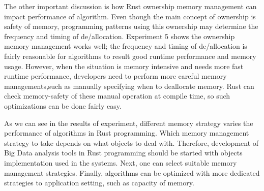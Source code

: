 The other important discussion is how Rust ownership memory management can impact performance of algorithm.
Even though the main concept of ownership is safety of memory, programming patterns using this ownership may determine the frequency and timing of de/allocation. 
Experiment 5 shows the ownership memory management works well; the frequency and timing of de/allocation is fairly reasonable for algorithms to result good runtime performance and memory usage. 
However, when the situation is memory intensive and needs more fast runtime performance, developers need to perform more careful memory managements,such as manually specifying when to deallocate memory.
Rust can check memory-safety of these manual operation at compile time, so such optimizations can be done fairly easy.

As we can see in the results of experiment, different memory strategy varies the performance of algorithms in Rust programming.
Which memory management strategy to take depends on what objects to deal with. 
Therefore, development of Big Data analysis tools in Rust programming should be started with objects implementation used in the systems.
Next, one can select suitable memory management strategies. 
Finally, algorithms can be optimized with more dedicated strategies to application setting, such as capacity of memory.